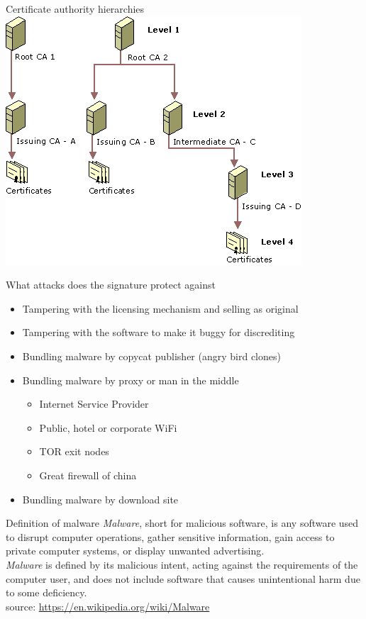 \documentclass[11pt]{beamer}
\begin{document}
\begin{frame}{Certificate authority hierarchies}
\includegraphics[scale=0.5]{certificate_authority_hierarchies.png}
\end{frame}

\begin{frame}{What attacks does the signature protect against}
\begin{itemize}
\item Tampering with the licensing mechanism and selling as original
\item Tampering with the software to make it buggy for discrediting
\item Bundling malware by copycat publisher (angry bird clones)
\item Bundling malware by proxy or man in the middle
\begin{itemize}
\item Internet Service Provider
\item Public, hotel or corporate WiFi
\item TOR exit nodes
\item Great firewall of china
\end{itemize}
\item Bundling malware by download site
\end{itemize}
\end{frame}

\begin{frame}{Definition of malware}
\emph{Malware}, short for malicious software, is any software used to disrupt computer operations, gather sensitive information, gain access to private computer systems, or display unwanted advertising.
\\[0.2cm]
\emph{Malware} is defined by its malicious intent, acting against the requirements of the computer user, and does not include software that causes unintentional harm due to some deficiency.
\\[0.2cm]
source: \href{https://en.wikipedia.org/wiki/Malware}{https://en.wikipedia.org/wiki/Malware}
\end{frame}
\end{document}
